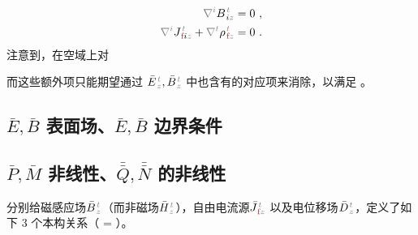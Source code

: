 \begin{subequations}
\begin{align}
	\mathcolor{gray}{\nabla^i} B^{\;\!\mathcolor{gray}{t}}_{\;\! i\mathcolor{gray}{z}} &= 0~, \label{eq:div-B'} \\
	\mathcolor{gray}{\nabla^i} J^{\;\!\mathcolor{gray}{t}}_{\;\!\textcolor{Maroon}{\text{f}} i\mathcolor{gray}{z}} + \mathcolor{gray}{\nabla^t} {\rho}^{\;\!\mathcolor{gray}{t}}_{\;\!\textcolor{Maroon}{\text{f}}\mathcolor{gray}{z}} &= 0~. \label{eq:div-e-f'}
\end{align}
\end{subequations}
注意到，在空域上对 

而这些额外项只能期望通过 $\bar{E}^{\;\!\mathcolor{gray}{t}}_{\;\!\mathcolor{gray}{z}},\bar{B}^{\;\!\mathcolor{gray}{t}}_{\;\!\mathcolor{gray}{z}}$ 中也含有的对应项来消除，以满足 。



\subsection{$\bar{E},\bar{B}$ 表面场、$\bar{E},\bar{B}$ 边界条件}\label{ssec:EB-boundary}

\subsection{$\bar{P},\bar{M}$ 非线性、$\bar{\bar{Q}},\bar{\bar{N}}$ 的非线性}\label{ssec:PMQN-nonlinear}

分别给磁感应场$\bar{B}^{\;\!\mathcolor{gray}{t}}_{\;\!\mathcolor{gray}{z}}$（而非磁场$\bar{H}^{\;\!\mathcolor{gray}{t}}_{\;\!\mathcolor{gray}{z}}$），自由电流源$\bar{J}^{\;\!\mathcolor{gray}{t}}_{\;\!\textcolor{Maroon}{\text{f}}\mathcolor{gray}{z}}$ 以及电位移场$\bar{D}^{\;\!\mathcolor{gray}{t}}_{\;\!\mathcolor{gray}{z}}$，定义了如下 3 个本构关系（\textcolor{Maroon}{} = \textcolor{Maroon}{}）。

